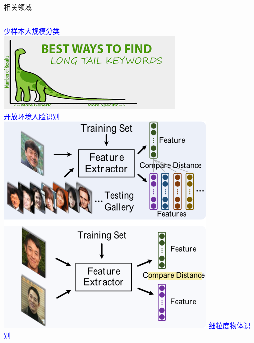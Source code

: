 \documentclass[notes]{beamer}
\begin{document}
\begin{frame}
	{相关领域}

	\begin{columns}

		\textcolor{blue}{少样本大规模分类} \\
		\includegraphics[width=.9\textwidth]{2018-03-15-21-58-23.png} \\
		\textcolor{blue}{开放环境人脸识别}\\
		\includegraphics[width=.97\textwidth]{2018-03-15-22-15-55.png}
		\textcolor{blue}{细粒度物体识别} \\

\end{columns}
\end{frame}
\end{document}
